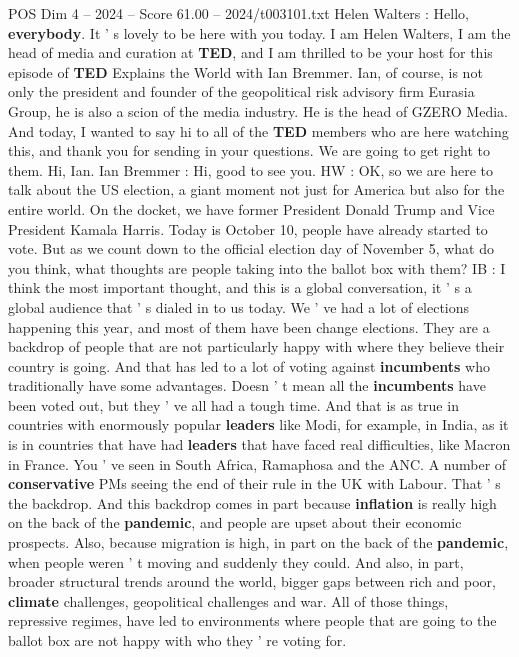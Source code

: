 \begin{textsample}{POS Dim 4 – 2024 – Score 61.00 – 2024/t003101.txt}  \label{ex:f4_pos_009}
Helen Walters : Hello, \textbf{everybody}.
It ' s lovely to be here with you today.
I am Helen Walters, I am the head of media and curation at \textbf{TED}, and I am thrilled to be your host for this episode of \textbf{TED} Explains the World with Ian Bremmer.
Ian, of course, is not only the president and founder of the geopolitical risk advisory firm Eurasia Group, he is also a scion of the media industry.
He is the head of GZERO Media.
And today, I wanted to say hi to all of the \textbf{TED} members who are here watching this, and thank you for sending in your questions.
We are going to get right to them.
Hi, Ian.
Ian Bremmer : Hi, good to see you.
HW : OK, so we are here to talk about the US election, a giant moment not just for America but also for the entire world.
On the docket, we have former President Donald Trump and Vice President Kamala Harris.
Today is October 10, people have already started to vote.
But as we count down to the official election day of November 5, what do you think, what thoughts are people taking into the ballot box with them?
IB : I think the most important thought, and this is a global conversation, it ' s a global audience that ' s dialed in to us today.
We ' ve had a lot of elections happening this year, and most of them have been change elections.
They are a backdrop of people that are not particularly happy with where they believe their country is going.
And that has led to a lot of voting against \textbf{incumbents} who traditionally have some advantages.
Doesn ' t mean all the \textbf{incumbents} have been voted out, but they ' ve all had a tough time.
And that is as true in countries with enormously popular \textbf{leaders} like Modi, for example, in India, as it is in countries that have had \textbf{leaders} that have faced real difficulties, like Macron in France.
You ' ve seen in South Africa, Ramaphosa and the ANC.
A number of \textbf{conservative} PMs seeing the end of their rule in the UK with Labour.
That ' s the backdrop.
And this backdrop comes in part because \textbf{inflation} is really high on the back of the \textbf{pandemic}, and people are upset about their economic prospects.
Also, because migration is high, in part on the back of the \textbf{pandemic}, when people weren ' t moving and suddenly they could.
And also, in part, broader structural trends around the world, bigger gaps between rich and poor, \textbf{climate} challenges, geopolitical challenges and war.
All of those things, repressive regimes, have led to environments where people that are going to the ballot box are not happy with who they ' re voting for.

\end{textsample}
